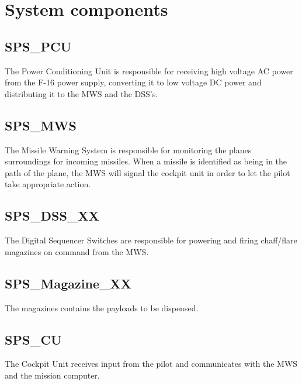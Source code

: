 \documentclass[Main]{subfiles}
\begin{document}
\section{System components}

\subsection{SPS\_PCU}
The Power Conditioning Unit is responsible for receiving high voltage AC power from the F-16 power supply, converting it to low voltage DC power and distributing it to the MWS and the DSS's.

\subsection{SPS\_MWS}
The Missile Warning System is responsible for monitoring the planes surroundings for incoming missiles.
When a missile is identified as being in the path of the plane, the MWS will signal the cockpit unit in order to let the pilot take appropriate action.

\subsection{SPS\_DSS\_XX}
The Digital Sequencer Switches are responsible for powering and firing chaff/flare magazines on command from the MWS.

\subsection{SPS\_Magazine\_XX}
The magazines contains the payloads to be dispensed.

\subsection{SPS\_CU}
The Cockpit Unit receives input from the pilot and communicates with the MWS and the mission computer.
\end{document}
